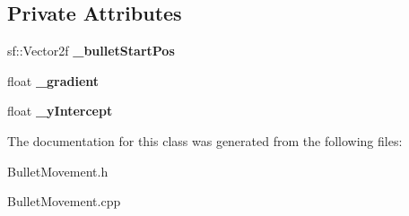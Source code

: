 \subsection*{Private Attributes}
\begin{DoxyCompactItemize}
\item 
\mbox{\label{class_bullet_movement_a80f3b6b7f248b1bfecc4845319bc91fc}} 
sf\+::\+Vector2f {\bfseries \+\_\+bullet\+Start\+Pos}
\item 
\mbox{\label{class_bullet_movement_a21abb8a9b6d5d1d6cd5e079648ade529}} 
float {\bfseries \+\_\+gradient}
\item 
\mbox{\label{class_bullet_movement_a8d20043e5da44b2585b78e0be9d9ad66}} 
float {\bfseries \+\_\+y\+Intercept}
\end{DoxyCompactItemize}


The documentation for this class was generated from the following files\+:\begin{DoxyCompactItemize}
\item 
Bullet\+Movement.\+h\item 
Bullet\+Movement.\+cpp\end{DoxyCompactItemize}
